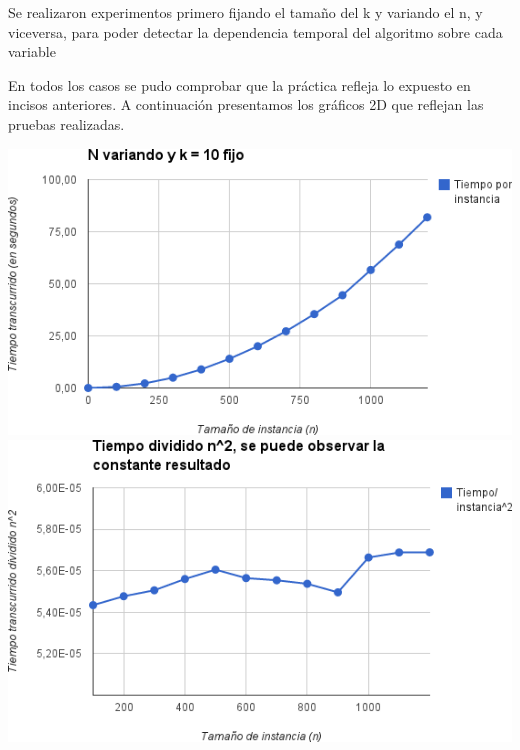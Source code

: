 \documentclass[10pt,a4paper]{article}
\begin{document}
Se realizaron experimentos primero fijando el tamaño del k y variando el n, y viceversa, para poder detectar la dependencia temporal del algoritmo sobre cada variable

En todos los casos se pudo comprobar que la práctica refleja lo expuesto en incisos anteriores. A continuación presentamos los gráficos 2D que reflejan las pruebas realizadas. 

\bigskip
\noindent \includegraphics[scale=0.45]{img/grafico_n.png}
\noindent \includegraphics[scale=0.45]{img/grafico_n2.png}
\end{document}
